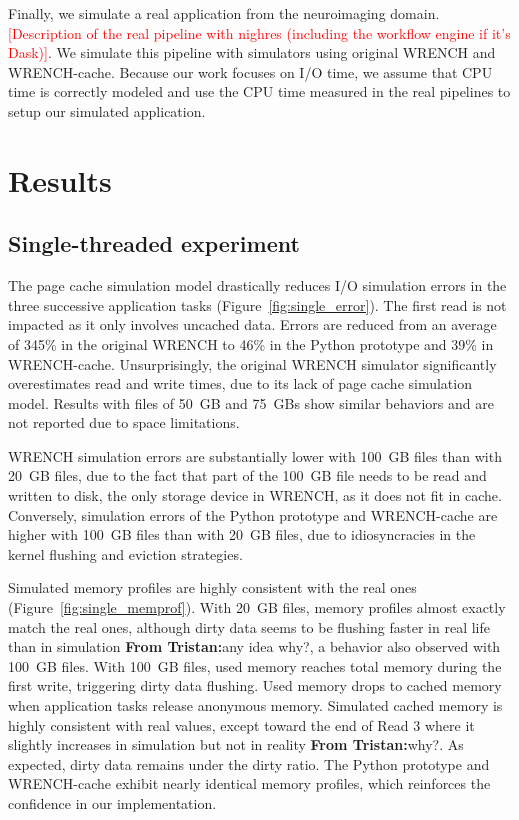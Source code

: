 \documentclass[conference]{IEEEtran}
\newcommand{\tristan}[1]{\color{orange}\textbf{From Tristan:}#1\color{black}}
\begin{document}
            Finally, we simulate a real application from the neuroimaging
            domain. \textcolor{red}{[Description of the real pipeline with
            nighres (including the workflow engine if it's Dask)]}.
            We simulate this pipeline with simulators using original WRENCH
            and WRENCH-cache. Because our work focuses on I/O time, we
            assume that CPU time is correctly modeled and use the CPU time
            measured in the real pipelines to setup our simulated
            application.

    \section{Results}
    \label{results}

        \subsection{Single-threaded experiment}

        The page cache simulation model drastically reduces I/O simulation
        errors in the three successive application tasks (Figure~\ref{fig:single_error}). The first read is not impacted 
        as it only involves uncached data. Errors are reduced from an average
        of 345\% in the original WRENCH to 46\% in the Python prototype and
        39\% in WRENCH-cache. Unsurprisingly, the original WRENCH simulator
        significantly overestimates read and write times, due to its lack
        of page cache simulation model. Results with files of 50~GB and 75~GBs
        show similar behaviors and are not reported due to space limitations.

        WRENCH simulation errors are substantially lower with 100~GB
        files than with 20~GB files, due to the fact that part of the
        100~GB file needs to be read and written to disk, the only storage
        device in WRENCH, as it does not fit in cache. Conversely,
        simulation errors of the Python prototype and WRENCH-cache are higher with
        100~GB files than with 20~GB files, due to idiosyncracies in the kernel 
        flushing and eviction strategies.

        Simulated memory profiles are highly consistent with the real ones
        (Figure~\ref{fig:single_memprof}). With 20~GB files, memory
        profiles almost exactly match the real ones, although dirty data
        seems to be flushing faster in real life than in simulation
        \tristan{any idea why?}, a behavior also observed with 100~GB files. With
        100~GB files, used memory reaches total memory during the first write,
        triggering dirty data flushing. Used memory drops to cached memory
        when application tasks release anonymous memory. Simulated cached
        memory is highly consistent with real values, except toward the end
        of Read 3 where it slightly increases in simulation but not in
        reality \tristan{why?}. As expected, dirty data remains under the
        dirty ratio. The Python prototype and WRENCH-cache exhibit nearly
        identical memory profiles, which reinforces the confidence in our
        implementation.
\end{document}
